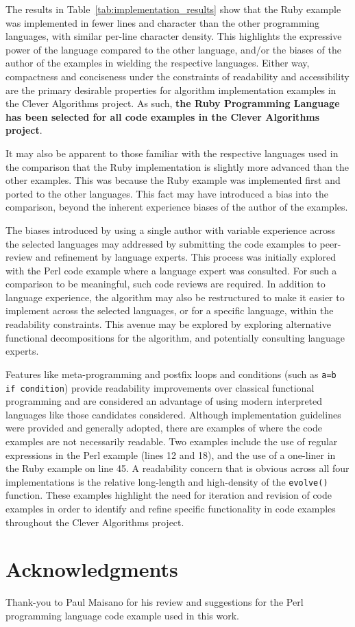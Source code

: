 \documentclass[a4paper, 11pt]{article}
\begin{document}
The results in Table~\ref{tab:implementation_results} show that the Ruby example was implemented in fewer lines and character than the other programming languages, with similar per-line character density. This highlights the expressive power of the language compared to the other language, and/or the biases of the author of the examples in wielding the respective languages. Either way, compactness and conciseness under the constraints of readability and accessibility are the primary desirable properties for algorithm implementation examples in the Clever Algorithms project. As such,\textbf{ the Ruby Programming Language has been selected for all code examples in the Clever Algorithms project}. 

It may also be apparent to those familiar with the respective languages used in the comparison that the Ruby implementation is slightly more advanced than the other examples. This was because the Ruby example was implemented first and ported to the other languages. This fact may have introduced a bias into the comparison, beyond the inherent experience biases of the author of the examples.

The biases introduced by using a single author with variable experience across the selected languages may addressed by submitting the code examples to peer-review and refinement by language experts. This process was initially explored with the Perl code example where a language expert was consulted. For such a comparison to be meaningful, such code reviews are required.
In addition to language experience, the algorithm may also be restructured to make it easier to implement across the selected languages, or for a specific language, within the readability constraints. This avenue may be explored by exploring alternative functional decompositions for the algorithm, and potentially consulting language experts. 

Features like meta-programming and postfix loops and conditions (such as \texttt{a=b if condition}) provide readability improvements over classical functional programming and are considered an advantage of using modern interpreted languages like those candidates considered. 
Although implementation guidelines were provided and generally adopted, there are examples of where the code examples are not necessarily readable. Two examples include the use of regular expressions in the Perl example (lines 12 and 18), and the use of a one-liner in the Ruby example on line 45. A readability concern that is obvious across all four implementations is the relative long-length and high-density of the \texttt{evolve()} function.
These examples highlight the need for iteration and revision of code examples in order to identify and refine specific functionality in code examples throughout the Clever Algorithms project.

% 
% 
\section{Acknowledgments}
\label{sec:acknowledgments}
Thank-you to Paul Maisano for his review and suggestions for the Perl programming language code example used in this work.



\end{document}
